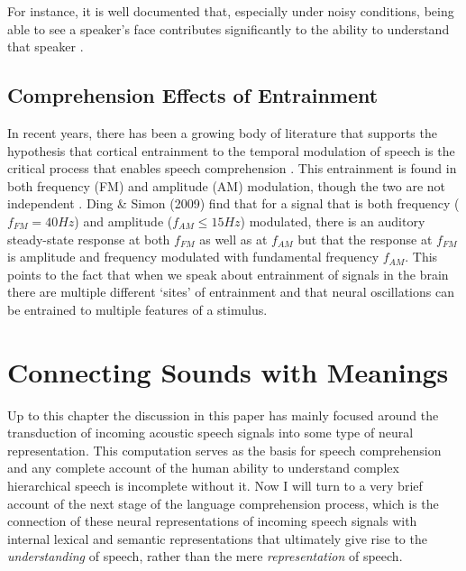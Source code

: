 \documentclass[titlepage]{article}
\begin{document}
    For instance, it is well documented that, especially under noisy
    conditions, being able to see a speaker's face contributes significantly to
    the ability to understand that speaker \cite{Sumby1954,Erber1969}.

  \subsection{Comprehension Effects of Entrainment}

    In recent years, there has been a growing body of literature that supports
    the hypothesis that cortical entrainment to the temporal modulation of
    speech is the critical process that enables speech comprehension
    \cite{Meyer2018,Morillon2015,ZionGolumbic2013,Doelling2014}. This
    entrainment is found in both frequency (FM) and amplitude (AM) modulation,
    though the two are not independent \cite{Ding2009}. Ding \& Simon (2009)
    \cite{Ding2009} find that for a signal that is both frequency
    ($f_{FM}=40Hz$) and amplitude ($f_{AM}\leq 15Hz$) modulated, there is an
    auditory steady-state response at both $f_{FM}$ as well as at $f_{AM}$ but
    that the response at $f_{FM}$ is amplitude and frequency modulated with
    fundamental frequency $f_{AM}$. This points to the fact that when we speak
    about entrainment of signals in the brain there are multiple different
    `sites' of entrainment and that neural oscillations can be entrained to
    multiple features of a stimulus.

\section{Connecting Sounds with Meanings} \label{meaning}

  Up to this chapter the discussion in this paper has mainly focused around the
  transduction of incoming acoustic speech signals into some type of neural
  representation. This computation serves as the basis for speech comprehension
  and any complete account of the human ability to understand complex
  hierarchical speech is incomplete without it. Now I will turn to a very brief
  account of the next stage of the language comprehension process, which is
  the connection of these neural representations of incoming speech signals
  with internal lexical and semantic representations that ultimately give rise
  to the \textit{understanding} of speech, rather than the mere
  \textit{representation} of speech.

\newpage
\printbibliography
\end{document}
